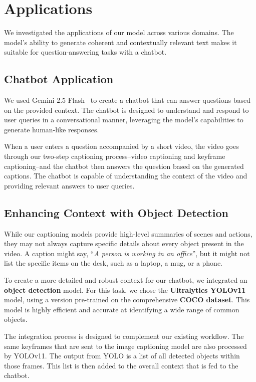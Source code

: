 \section{Applications}

We investigated the applications of our model across various domains. The model's ability to generate coherent and contextually relevant text makes it suitable for question-answering tasks with a chatbot.



\subsection{Chatbot Application}

We used Gemini 2.5 Flash~\cite{comanici2025gemini} to create a chatbot that can answer questions based on the provided context. The chatbot is designed to understand and respond to user queries in a conversational manner, leveraging the model's capabilities to generate human-like responses.

When a user enters a question accompanied by a short video, the video goes through our two-step captioning process--video captioning and keyframe captioning--and the chatbot then answers the question based on the generated captions. The chatbot is capable of understanding the context of the video and providing relevant answers to user queries.

\subsection{Enhancing Context with Object Detection}

While our captioning models provide high-level summaries of scenes and actions, they may not always capture specific details about every object present in the video. A caption might say, ``\textit{A person is working in an office}'', but it might not list the specific items on the desk, such as a laptop, a mug, or a phone.

To create a more detailed and robust context for our chatbot, we integrated an \textbf{object detection} model. For this task, we chose the \textbf{Ultralytics YOLOv11}~\cite{yolo11_ultralytics} model, using a version pre-trained on the comprehensive \textbf{COCO dataset}. This model is highly efficient and accurate at identifying a wide range of common objects.

The integration process is designed to complement our existing workflow. The same keyframes that are sent to the image captioning model are also processed by YOLOv11. The output from YOLO is a list of all detected objects within those frames. This list is then added to the overall context that is fed to the chatbot.


